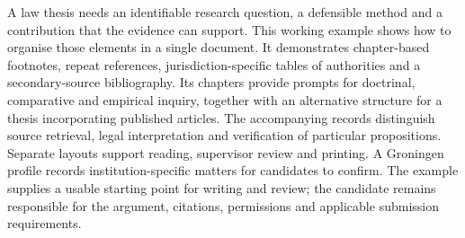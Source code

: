\noindent A law thesis needs an identifiable research question, a defensible
method and a contribution that the evidence can support. This working example
shows how to organise those elements in a single document. It demonstrates
chapter-based footnotes, repeat references, jurisdiction-specific tables of
authorities and a secondary-source bibliography. Its chapters provide prompts
for doctrinal, comparative and empirical inquiry, together with an alternative
structure for a thesis incorporating published articles. The accompanying
records distinguish source retrieval, legal interpretation and verification
of particular propositions. Separate layouts support reading, supervisor
review and printing. A Groningen profile records institution-specific matters
for candidates to confirm. The example supplies a usable starting point for
writing and review; the candidate remains responsible for the argument,
citations, permissions and applicable submission requirements.

